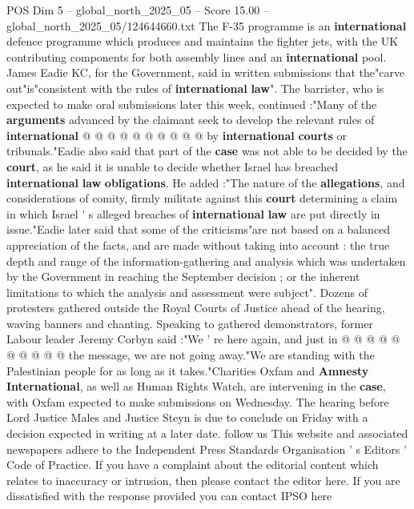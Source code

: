 \begin{textsample}{POS Dim 5 – global\_north\_2025\_05 – Score 15.00 – global\_north\_2025\_05/124644660.txt}
The F-35 programme is an \textbf{international} defence programme which produces and maintains the fighter jets, with the UK contributing components for both assembly lines and an \textbf{international} pool.
James Eadie KC, for the Government, said in written submissions that the"carve out"is"consistent with the rules of \textbf{international} \textbf{law}".
The barrister, who is expected to make oral submissions later this week, continued :"Many of the \textbf{arguments} advanced by the claimant seek to develop the relevant rules of \textbf{international} @ @ @ @ @ @ @ @ @ @ by \textbf{international} \textbf{courts} or tribunals."Eadie also said that part of the \textbf{case} was not able to be decided by the \textbf{court}, as he said it is unable to decide whether Israel has breached \textbf{international} \textbf{law} \textbf{obligations}.
He added :"The nature of the \textbf{allegations}, and considerations of comity, firmly militate against this \textbf{court} determining a claim in which Israel ' s alleged breaches of \textbf{international} \textbf{law} are put directly in issue."Eadie later said that some of the criticisms"are not based on a balanced appreciation of the facts, and are made without taking into account : the true depth and range of the information-gathering and analysis which was undertaken by the Government in reaching the September decision ; or the inherent limitations to which the analysis and assessment were subject".
Dozens of protesters gathered outside the Royal Courts of Justice ahead of the hearing, waving banners and chanting.
Speaking to gathered demonstrators, former Labour leader Jeremy Corbyn said :"We ' re here again, and just in @ @ @ @ @ @ @ @ @ @ the message, we are not going away."We are standing with the Palestinian people for as long as it takes."Charities Oxfam and \textbf{Amnesty} \textbf{International}, as well as Human Rights Watch, are intervening in the \textbf{case}, with Oxfam expected to make submissions on Wednesday.
The hearing before Lord Justice Males and Justice Steyn is due to conclude on Friday with a decision expected in writing at a later date. follow us This website and associated newspapers adhere to the Independent Press Standards Organisation ' s Editors ' Code of Practice.
If you have a complaint about the editorial content which relates to inaccuracy or intrusion, then please contact the editor here.
If you are dissatisfied with the response provided you can contact IPSO here

\end{textsample}
